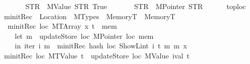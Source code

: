 \begin{isabellebody}
\ \ \ \ \ \ \ {\isacharparenleft}{\kern0pt}STR\ {\isacharprime}{\kern0pt}{\isacharprime}{\kern0pt}{}{\isachardot}{\kern0pt}{}{\isachardot}{\kern0pt}{}{\isacharprime}{\kern0pt}{\isacharprime}{\kern0pt}{\isacharcomma}{\kern0pt}\ MValue\ STR\ {\isacharprime}{\kern0pt}{\isacharprime}{\kern0pt}True{\isacharprime}{\kern0pt}{\isacharprime}{\kern0pt}{\isacharparenright}{\kern0pt}{\isacharcomma}{\kern0pt}\isanewline
\ \ \ \ \ \ \ {\isacharparenleft}{\kern0pt}STR\ {\isacharprime}{\kern0pt}{\isacharprime}{\kern0pt}{}{\isachardot}{\kern0pt}{}{\isacharprime}{\kern0pt}{\isacharprime}{\kern0pt}{\isacharcomma}{\kern0pt}\ MPointer\ STR\ {\isacharprime}{\kern0pt}{\isacharprime}{\kern0pt}{}{\isachardot}{\kern0pt}{}{\isacharprime}{\kern0pt}{\isacharprime}{\kern0pt}{\isacharparenright}{\kern0pt}{\isacharbrackright}{\kern0pt}{\isacharcomma}{\kern0pt}\isanewline
\ \ \ \ \ toploc\ {\isacharequal}{\kern0pt}\ {}{\isasymrparr}{\isachardoublequoteclose}%
\isadelimdocument
%
\endisadelimdocument
%
\isatagdocument
%
\isamarkuptrue%
%
\isamarkuptrue%
%
\endisatagdocument
{\isafolddocument}%
%
\isadelimdocument
%
\endisadelimdocument
{}\isamarkupfalse%
\ minitRec\ {\isacharcolon}{\kern0pt}{\isacharcolon}{\kern0pt}\ {\isachardoublequoteopen}Location\ {\isasymRightarrow}\ MTypes\ {\isasymRightarrow}\ MemoryT\ {\isasymRightarrow}\ MemoryT{\isachardoublequoteclose}\isanewline
{}\isanewline
\ \ {\isachardoublequoteopen}minitRec\ loc\ {\isacharparenleft}{\kern0pt}MTArray\ x\ t{\isacharparenright}{\kern0pt}\ {\isacharequal}{\kern0pt}\ {\isacharparenleft}{\kern0pt}{\isasymlambda}mem{\isachardot}{\kern0pt}\isanewline
\ \ \ \ let\ m\ {\isacharequal}{\kern0pt}\ updateStore\ loc\ {\isacharparenleft}{\kern0pt}MPointer\ loc{\isacharparenright}{\kern0pt}\ mem\isanewline
\ \ \ \ in\ iter\ {\isacharparenleft}{\kern0pt}{\isasymlambda}i\ m{\isacharprime}{\kern0pt}\ {\isachardot}{\kern0pt}\ minitRec\ {\isacharparenleft}{\kern0pt}hash\ loc\ {\isacharparenleft}{\kern0pt}ShowL\isactrlsub i\isactrlsub n\isactrlsub t\ i{\isacharparenright}{\kern0pt}{\isacharparenright}{\kern0pt}\ t\ m{\isacharprime}{\kern0pt}{\isacharparenright}{\kern0pt}\ m\ x{\isacharparenright}{\kern0pt}{\isachardoublequoteclose}\isanewline
{\isacharbar}{\kern0pt}\ {\isachardoublequoteopen}minitRec\ loc\ {\isacharparenleft}{\kern0pt}MTValue\ t{\isacharparenright}{\kern0pt}\ {\isacharequal}{\kern0pt}\ updateStore\ loc\ {\isacharparenleft}{\kern0pt}MValue\ {\isacharparenleft}{\kern0pt}ival\ t{\isacharparenright}{\kern0pt}{\isacharparenright}{\kern0pt}{\isachardoublequoteclose}\isanewline

\end{isabellebody}
